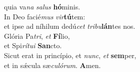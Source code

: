 \evenverse quia va\textit{na} \textit{sa}\textit{lus} \textbf{hó}minis.\\
\oddverse In Deo facié\textit{mus} \textit{vir}\textbf{tú}tem:~\*\\
\oddverse et ipse ad níhilum dedú\textit{cet} \textit{tri}\textit{bu}\textbf{lán}tes nos.\\
\evenverse Glória Pa\textit{tri}, \textit{et} \textbf{Fí}lio,~\*\\
\evenverse et Spi\textit{rí}\textit{tu}\textit{i} \textbf{San}cto.\\
\oddverse Sicut erat in princípio, et \textit{nunc}, \textit{et} \textbf{sem}per,~\*\\
\oddverse et in sǽcula sæ\textit{cu}\textit{ló}\textit{rum}. \textbf{A}men.\\
